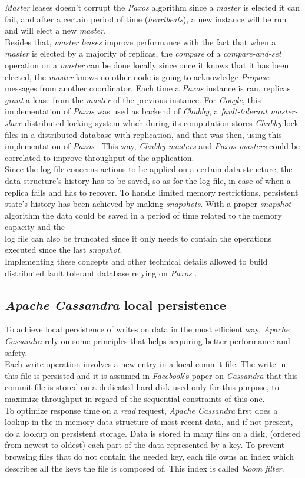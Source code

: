 \documentclass[a4paper]{report}
\newcommand{\ca}{\emph{Apache Cassandra }}
\newcommand{\px}{\emph{Paxos }}
\begin{document}
\emph{Master} leases doesn't corrupt the \px algorithm since a \emph{master} is elected it can fail, and after a certain period of time (\emph{heartbeats}), a new instance will be run and will elect a new \emph{master}.\\
Besides that, \emph{master leases} improve performance with the fact that when a \emph{master} is elected by a majority of replicas, the \emph{compare} of a \emph{compare-and-set} operation on a \emph{master} can be done locally since once it knows that it has been elected, the \emph{master} knows no other node is going to acknowledge \emph{Propose} messages from another coordinator. Each time a \px instance is ran, replicas \emph{grant} a lease from the \emph{master} of the previous instance. For \emph{Google}, this implementation of \px was used as backend of \emph{Chubby}, a \emph{fault-tolerant master-slave} distributed locking system which during its computation stores \emph{Chubby} lock files in a distributed database with replication, and that was then, using this implementation of \px. This way, \emph{Chubby masters} and \emph{Paxos masters} could be correlated to improve throughput of the application.\\
Since the log file concerns actions to be applied on a certain data structure, the data structure's history has to be saved, so as for the log file, in case of when a replica fails and has to recover. To handle limited memory restrictions, persistent state's history has been achieved by making \emph{snapshots}. With a proper \emph{snapshot} algorithm the data could be saved in a period of time related to the memory capacity and the \\
log file can also be truncated since it only needs to contain the operations executed since the last \emph{snapshot}.\\
Implementing these concepts and other technical details allowed to build distributed fault tolerant database relying on \px.

\subsection{\ca local persistence} %
\label{sub:ca_local_persitency}

To achieve local persistence of writes on data in the most efficient way, \ca rely on some principles that helps acquiring better performance and safety.\\
Each write operation involves a new entry in a local commit file. The write in this file is persisted and it is assumed in \emph{Facebook}'s paper on \emph{Cassandra} that this commit file is stored on a dedicated hard disk used only for this purpose, to maximize throughput in regard of the sequential constraints of this one.\\
To optimize response time on a \emph{read} request, \ca first does a lookup in the in-memory data structure of most recent data, and if not present, do a lookup on persistent storage. Data is stored in many files on a disk, (ordered from newest to oldest) each part of the data represented by a key. To prevent browsing files that do not contain the needed key, each file owns an index which describes all the keys the file is composed of. This index is called \emph{bloom filter}.
\end{document}
